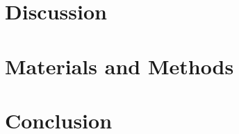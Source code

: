 \documentclass{article}
\begin{document}
\section{Discussion}

\Blindtext

\section{Materials and Methods}

\blindtext

\section{Conclusion}

\blindtext
\end{document}
